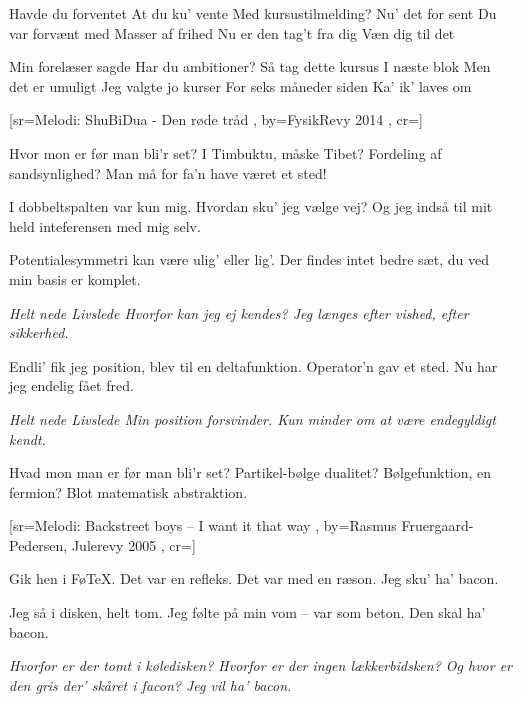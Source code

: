 \documentclass[pdftex,12pt]{article}
\begin{document}
\begin{songs}{}
\beginverse
Havde du forventet
At du ku' vente
Med kursustilmelding?
Nu' det for sent
Du var forvænt med
Masser af frihed
Nu er den tag't fra dig
Væn dig til det
\endverse

\beginverse
Min forelæser sagde
Har du ambitioner?
Så tag dette kursus
I næste blok
Men det er umuligt
Jeg valgte jo kurser
For seks måneder siden
Ka' ik' laves om
\endverse
\endsong



﻿[sr={Melodi: ShuBiDua - Den røde tråd}
,
by={FysikRevy 2014}
,
cr={}]\hypertarget{Kvantepartiklen}{}
\label{song77}

\beginverse
Hvor mon er før man bli'r set?
I Timbuktu, måske Tibet?
Fordeling af sandsynlighed?
Man må for fa'n have været et sted!

\endverse
\beginverse
I dobbeltspalten var kun mig.
Hvordan sku' jeg vælge vej?
Og jeg indså til mit held
inteferensen med mig selv.

\endverse
\beginverse
Potentialesymmetri
kan være ulig' eller lig'.
Der findes intet bedre sæt,
du ved min basis er komplet.

\endverse
\beginverse
\emph{Helt nede
Livslede
Hvorfor kan jeg ej kendes?
Jeg længes efter vished, efter sikkerhed.}

\endverse
\beginverse
Endli' fik jeg position,
blev til en deltafunktion.
Operator'n gav et sted.
Nu har jeg endelig fået fred.

\endverse
\beginverse
\emph{Helt nede
Livslede
Min position forsvinder.
Kun minder om at være endegyldigt kendt.}

\endverse
\beginverse
Hvad mon man er før man bli'r set?
Partikel-bølge dualitet?
Bølgefunktion, en fermion?
Blot matematisk abstraktion.

\endverse
\endsong



[sr={Melodi: Backstreet boys -- I want it that way}
,
by={Rasmus Fruergaard-Pedersen, Julerevy 2005}
,
cr={}]\hypertarget{Ode til bacon}{}
\label{song78}

\beginverse
Gik hen i Fø\TeX.
Det var en refleks.
Det var med en ræson.
Jeg sku’ ha’ bacon.

\endverse
\beginverse
Jeg så i disken,
helt tom. Jeg følte
på min vom – var som beton.
Den skal ha’ bacon.

\endverse
\beginverse
\emph{Hvorfor er
der tomt i køledisken?
Hvorfor er
der ingen lækkerbidsken?
Og hvor er
den gris der’ skåret i facon?
Jeg vil ha’ bacon.}


\end{songs}
\end{document}
